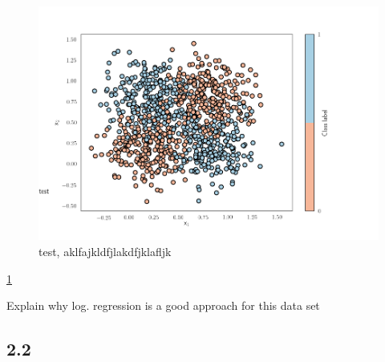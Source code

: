\documentclass[11pt]{article}
\makeatletter
\def\maxwidth{\ifdim\Gin@nat@width>\linewidth\linewidth
    \else\Gin@nat@width\fi}
\let\Oldincludegraphics\includegraphics
\renewcommand{\includegraphics}[1]{\Oldincludegraphics[width=.8\maxwidth]{#1}}
\makeatother
\begin{document}
    \begin{figure}
	    \centering \includegraphics{Figures/21.png}
	    \caption{test, aklfajkldfjlakdfjklafljk}
		\label{fig:1}
	\end{figure}

\ref{fig:1}

    Explain why log. regression is a good approach for this data set

    \subsection{2.2}\label{section}
\end{document}
